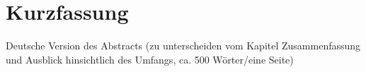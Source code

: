 
\chapter*{Kurzfassung}
\label{ch:GermanAbstract}
Deutsche Version des Abstracts
(zu unterscheiden vom Kapitel Zusammenfassung und Ausblick
hinsichtlich des Umfangs, ca. 500 Wörter/eine Seite)

